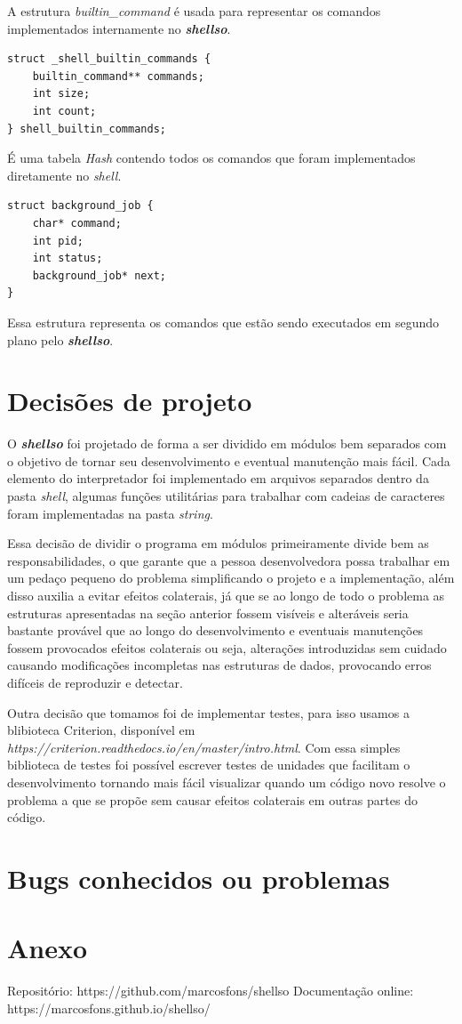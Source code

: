 \documentclass[a4paper, 12pt]{article}
\begin{document}
A estrutura \textit{builtin\_command} é usada para representar os comandos implementados
internamente no \textbf{\textit{shellso}}.

\begin{verbatim}
struct _shell_builtin_commands {
    builtin_command** commands;
    int size;
    int count;
} shell_builtin_commands;
\end{verbatim}

É uma tabela \textit{Hash} contendo todos os comandos que foram implementados diretamente
no \textit{shell}.

\begin{verbatim}
struct background_job {
    char* command;
    int pid;
    int status;
    background_job* next;
}
\end{verbatim}

Essa estrutura representa os comandos que estão sendo executados em segundo plano pelo \textbf{\textit{shellso}}.

\newpage

\section{Decisões de projeto}

O \textbf{\textit{shellso}} foi projetado de forma a ser dividido em módulos bem separados
com o objetivo de tornar seu desenvolvimento e eventual manutenção mais fácil. Cada elemento
do interpretador foi implementado em arquivos separados dentro da pasta \textit{shell}, algumas
funções utilitárias para trabalhar com cadeias de caracteres foram implementadas na pasta \textit{string}.

Essa decisão de dividir o programa em módulos primeiramente divide bem as responsabilidades, 
o que garante que a pessoa desenvolvedora possa trabalhar em um pedaço pequeno do problema simplificando
o projeto e a implementação, além disso auxilia a evitar efeitos colaterais, já que se ao
longo de todo o problema as estruturas apresentadas na seção anterior fossem visíveis e 
alteráveis seria bastante provável que ao longo do desenvolvimento e eventuais manutenções
fossem provocados efeitos colaterais ou seja, alterações introduzidas sem cuidado
causando modificações incompletas nas estruturas de dados, provocando erros difíceis de reproduzir e detectar.

Outra decisão que tomamos foi de implementar testes, para isso usamos a blibioteca Criterion, disponível em 
\textit{https://criterion.readthedocs.io/en/master/intro.html}. Com essa simples biblioteca de testes 
foi possível escrever testes de unidades que facilitam o desenvolvimento tornando mais fácil
visualizar quando um código novo resolve o problema a que se propõe sem causar efeitos colaterais
em outras partes do código.

\newpage

\section{Bugs conhecidos ou problemas}
\newpage

\section*{Anexo}
Repositório: https://github.com/marcosfons/shellso
Documentação online: https://marcosfons.github.io/shellso/
\end{document}
